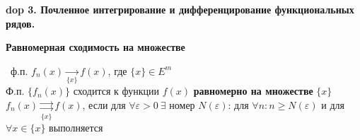 \textbf{\LARGE dop 3. Почленное интегрирование и дифференцирование функциональных рядов.}









\textbf{Равномерная сходимость на множестве}

\mathLet \ ф.п. $f_n(x) \xrightarrow[\{x\}]{}  f(x)$, где $\{x\} \in E^m$ \\
Ф.п. $\{f_n(x)\}$ сходится к функции $f(x)$ \textbf{равномерно на множестве} $\{x\}$ \ $f_n(x)\underset{\{x\}}{\rightrightarrows}f(x)$, если для $\forall \varepsilon > 0 \ \exists$ номер $N(\varepsilon)$: для $\forall n: n \ge N(\varepsilon)$ и для $\forall x \in \{x\}$ выполняется


